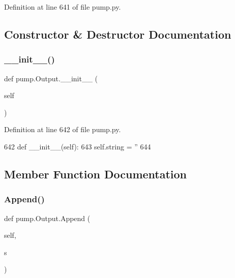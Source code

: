 Definition at line 641 of file pump.\+py.



\subsection{Constructor \& Destructor Documentation}
\mbox{\label{classpump_1_1Output_a01a703055e40078561bd4a5011de4a6d}} 
\subsubsection{\texorpdfstring{\+\_\+\+\_\+init\+\_\+\+\_\+()}{\_\_init\_\_()}}
{\footnotesize\ttfamily def pump.\+Output.\+\_\+\+\_\+init\+\_\+\+\_\+ (\begin{DoxyParamCaption}\item[{}]{self }\end{DoxyParamCaption})}



Definition at line 642 of file pump.\+py.


\begin{DoxyCode}
642   \textcolor{keyword}{def }\_\_init\_\_(self):
643     self.string = \textcolor{stringliteral}{''}
644 
\end{DoxyCode}


\subsection{Member Function Documentation}
\mbox{\label{classpump_1_1Output_a6f284bb3f80e03594bc28286c695f5a7}} 
\subsubsection{\texorpdfstring{Append()}{Append()}}
{\footnotesize\ttfamily def pump.\+Output.\+Append (\begin{DoxyParamCaption}\item[{}]{self,  }\item[{}]{s }\end{DoxyParamCaption})}



